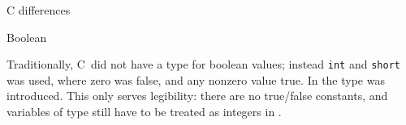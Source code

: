 \begin{comment}
  \Level 1 {Number values and undefined values}

  A computer allocates a fixed amount of space for integers and floating
  point numbers, typically 4 or 8 bytes. That means that not all numbers
  are representable.
  \begin{itemize}
  \item Using 4 bytes, that is 32 bits, we can represent $2^{32}$
    integers. Typically this is the range $-2^{31}\ldots 0 \ldots
    2^{31}-1$.
  \item Floating point numbers are represented by a sign bit, an
    exponent, and a number of significant digits.
    For 4-byte numbers, the number of significant (decimal) digits is
    around~6; for 8-byte numbers it is around 15.
  \end{itemize}

  If you compute a number that `fall in between the gaps' of the
  representable numbers, it gets truncated or rounded. The effects of
  this on your computation constitute its own field of numerical
  mathematics, called \indexterm{roundoff error analysis}.

  If a number goes outside the bounds of what is representable, it
  becomes either:
  \begin{itemize}
  \item \indextermtt{Inf}: infinity. This happens if you add or multiply
    enough large numbers together. There is of course also a value
    \n{-}\indextermtt{Inf}. Or:
  \item \indextermtt{NaN}: not a number. This happens if you subtract
    one \lstinline{Inf} from another, or do things such as taking the
    root of a negative number.
  \end{itemize}
  Your program will not be interrupted if a \lstinline{NaN} or \lstinline{Inf} is
  generated: the computation will merrily (and at full speed) progress
  with these numbers. See section~\ref{sec:limits} for detection of such quantities.

  Some people advocate filling uninitialized memory with such illegal
  values, to make it recognizable as such.
\end{comment}

 {C differences}

 {Boolean}

Traditionally, C~did not have a type for boolean values;
instead \lstinline{int} and \lstinline{short} was used,
where zero was false, and any nonzero value true.
In  the type  was introduced.
This only serves legibility: there are no true/false constants,
and variables of type  still have to be treated as
integers in .

